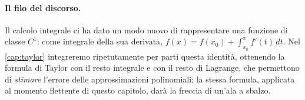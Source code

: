 \paragraph{Il filo del discorso.} Il calcolo integrale ci ha dato un modo nuovo di
rappresentare una funzione di classe $C^{1}$: come integrale della sua derivata,
$f(x)=f(x_{0})+\int_{x_{0}}^{x}f'(t)\,dt$. Nel \cref{cap:taylor} integreremo ripetutamente
per parti questa identità, ottenendo la formula di Taylor con il resto integrale e con il
resto di Lagrange, che permettono di \emph{stimare} l'errore delle approssimazioni
polinomiali; la stessa formula, applicata al momento flettente di questo capitolo, darà
la freccia di un'ala a sbalzo.
